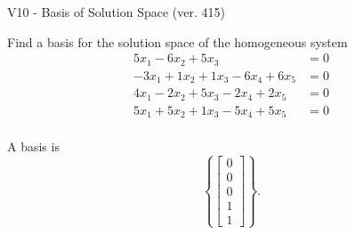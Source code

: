 \begin{exercise}
  \begin{exerciseTitle}V10 - Basis of Solution Space (ver. 415)\end{exerciseTitle}
  \begin{exerciseStatement}
    Find a basis for the solution space of the homogeneous system 
\begin{align*}
 5 x_ 1 -6 x_ 2 + 5 x_ 3 &= 0  \\ 
  -3 x_ 1 + 1 x_ 2 + 1 x_ 3 -6 x_ 4 + 6 x_ 5 &= 0  \\ 
  4 x_ 1 -2 x_ 2 + 5 x_ 3 -2 x_ 4 + 2 x_ 5 &= 0  \\ 
  5 x_ 1 + 5 x_ 2 + 1 x_ 3 -5 x_ 4 + 5 x_ 5 &= 0  \\ 
 \end{align*}


 
  \end{exerciseStatement}

  \begin{exerciseAnswer}
   A basis is   
\[\left\{\left[\begin{array}{c}
0 \\
0 \\
0 \\
1 \\
1
\end{array}\right]\right\}.\]

  


  \end{exerciseAnswer}
\end{exercise}